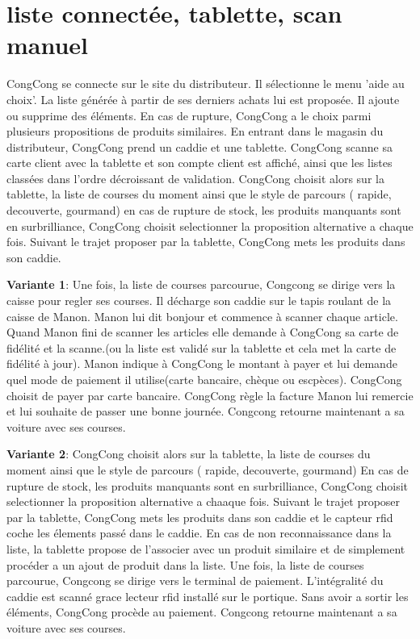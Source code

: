 \section{liste connectée, tablette, scan manuel}

CongCong se connecte sur le site du distributeur.
Il sélectionne le menu 'aide au choix'.
La liste générée à partir de ses derniers achats lui est proposée.
Il ajoute ou supprime des éléments.
En cas de rupture, CongCong a le choix parmi plusieurs propositions de produits similaires.
En entrant dans le magasin du distributeur, CongCong prend un caddie et une tablette.
CongCong scanne sa carte client avec la tablette et son compte client est affiché, ainsi que les listes classées dans l'ordre décroissant de validation.
CongCong choisit alors sur la tablette, la liste de courses du moment ainsi que le style de parcours ( rapide, decouverte, gourmand)
en cas de rupture de stock, les produits manquants sont en surbrilliance, CongCong choisit selectionner la proposition alternative a chaque fois.
Suivant le trajet proposer par la tablette, CongCong mets les produits dans son caddie.
\startitemize
\item {\bf Variante 1}: 
Une fois, la liste de courses parcourue, Congcong se dirige vers la caisse pour regler ses courses. 
Il décharge son caddie sur le tapis roulant de la caisse de Manon.
Manon lui dit bonjour et commence à scanner chaque article.
Quand Manon fini de scanner les articles elle demande à CongCong sa carte de fidélité et la scanne.(ou la liste est validé sur la tablette et cela met la carte de fidélité à jour).
Manon indique à CongCong le montant à payer et lui demande quel mode de paiement il utilise(carte bancaire, chèque ou escpèces).
CongCong choisit de payer par carte bancaire. 
CongCong règle la facture
Manon lui remercie et lui souhaite de passer une bonne journée.
Congcong retourne maintenant a sa voiture avec ses courses.
\item {\bf Variante 2}: 
CongCong choisit alors sur la tablette, la liste de courses du moment ainsi que le style de parcours ( rapide, decouverte, gourmand)
En cas de rupture de stock, les produits manquants sont en surbrilliance, CongCong choisit selectionner la proposition alternative a chaaque fois.
Suivant le trajet proposer par la tablette, CongCong mets les produits dans son caddie et le capteur rfid coche les élements passé dans le caddie. En cas de non reconnaissance dans la liste, la tablette propose de l'associer avec un produit similaire et de simplement procéder a un ajout de produit dans la liste.
Une fois, la liste de courses parcourue, Congcong se dirige vers le terminal de paiement. L'intégralité du caddie est scanné grace lecteur rfid installé sur le portique.
Sans avoir a sortir les éléments, CongCong procède au paiement.
Congcong retourne maintenant a sa voiture avec ses courses.
\stopitemize

